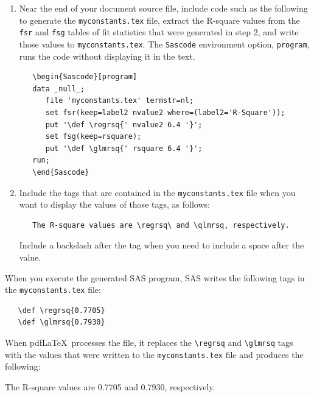\documentclass[article,oneside]{memoir}
\begin{document}
\begin{enumerate}
\item Near the end of your document source file, include code such as the
      following to generate the \texttt{myconstants.tex} file, extract the
      R-square values from the \texttt{fsr} and \texttt{fsg} tables of fit statistics that were
      generated in step 2, and write those values to \texttt{myconstants.tex}.
      The \texttt{Sascode} environment option, \texttt{program},
      runs the code without displaying it in the text.
\begin{snugshade}
\begin{verbatim}
   \begin{Sascode}[program]
   data _null_;
      file 'myconstants.tex' termstr=nl;
      set fsr(keep=label2 nvalue2 where=(label2='R-Square'));
      put '\def \regrsq{' nvalue2 6.4 '}';
      set fsg(keep=rsquare);
      put '\def \glmrsq{' rsquare 6.4 '}';
   run;
   \end{Sascode}
\end{verbatim}
\end{snugshade}

\item Include the tags that are contained
     in the \texttt{myconstants.tex} file when you want to display
     the values of those tags, as follows:
\begin{snugshade}
\begin{verbatim}
   The R-square values are \regrsq\ and \qlmrsq, respectively.
\end{verbatim}
\end{snugshade}
   Include a backslash after the tag when you need to include a space after the value.
\end{enumerate}

When you execute the generated SAS program, SAS writes the
following tags in the \texttt{myconstants.tex} file:
\begin{snugshade}
\begin{verbatim}
   \def \regrsq{0.7705}
   \def \glmrsq{0.7930}
\end{verbatim}
\end{snugshade}

When pdf\LaTeX\ processes the file, it replaces the
\verb+\regrsq+ and \verb+\glmrsq+ tags with the values that were
written to the \texttt{myconstants.tex} file and produces the
following:
\begin{snugshade}
   The R-square values are 0.7705 and 0.7930, respectively.
\end{snugshade}
\end{document}
